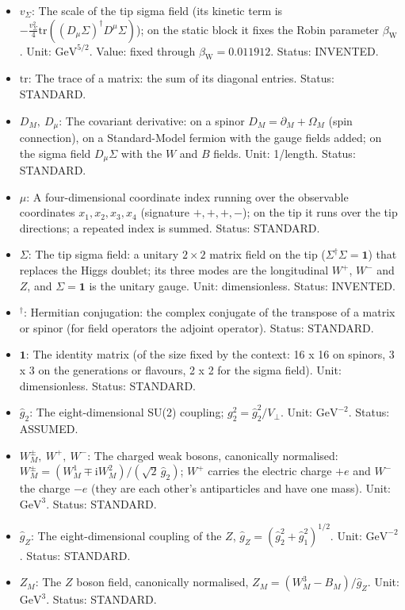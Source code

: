 \documentclass[
  10pt,
]{article}
\providecommand{\tightlist}{%
  \setlength{\itemsep}{0pt}\setlength{\parskip}{0pt}}
\begin{document}
\begin{itemize}
\tightlist
\item
  \(v_\Sigma\): The scale of the tip sigma field (its kinetic term is
  \(-\frac{v_\Sigma^2}{4}\mathrm{tr}((D_\mu\Sigma)^\dagger D^\mu\Sigma)\));
  on the static block it fixes the Robin parameter
  \(\beta_{\mathrm{W}}\). Unit: \(\mathrm{GeV}^{5/2}\). Value: fixed
  through \(\beta_{\mathrm{W}} = 0.011912\). Status: INVENTED.
\item
  \(\mathrm{tr}\): The trace of a matrix: the sum of its diagonal
  entries. Status: STANDARD.
\item
  \(D_M,\ D_\mu\): The covariant derivative: on a spinor
  \(D_M = \partial_M + \Omega_M\) (spin connection), on a Standard-Model
  fermion with the gauge fields added; on the sigma field
  \(D_\mu\Sigma\) with the \(W\) and \(B\) fields. Unit: 1/length.
  Status: STANDARD.
\item
  \(\mu\): A four-dimensional coordinate index running over the
  observable coordinates \(x_1, x_2, x_3, x_4\) (signature \(+,+,+,-\));
  on the tip it runs over the tip directions; a repeated index is
  summed. Status: STANDARD.
\item
  \(\Sigma\): The tip sigma field: a unitary \(2 \times 2\) matrix field
  on the tip (\(\Sigma^\dagger\Sigma = \mathbf{1}\)) that replaces the
  Higgs doublet; its three modes are the longitudinal \(W^+\), \(W^-\)
  and \(Z\), and \(\Sigma = \mathbf{1}\) is the unitary gauge. Unit:
  dimensionless. Status: INVENTED.
\item
  \({}^\dagger\): Hermitian conjugation: the complex conjugate of the
  transpose of a matrix or spinor (for field operators the adjoint
  operator). Status: STANDARD.
\item
  \(\mathbf{1}\): The identity matrix (of the size fixed by the context:
  16 x 16 on spinors, 3 x 3 on the generations or flavours, 2 x 2 for
  the sigma field). Unit: dimensionless. Status: STANDARD.
\item
  \(\hat g_2\): The eight-dimensional SU(2) coupling;
  \(g_2^2 = \hat g_2^2/V_\perp\). Unit: \(\mathrm{GeV}^{-2}\). Status:
  ASSUMED.
\item
  \(W^\pm_M,\ W^+,\ W^-\): The charged weak bosons, canonically
  normalised:
  \(W^\pm_M = (W^1_M \mp \mathrm{i}W^2_M)/(\sqrt2\,\hat g_2)\); \(W^+\)
  carries the electric charge \(+e\) and \(W^-\) the charge \(-e\) (they
  are each other's antiparticles and have one mass). Unit:
  \(\mathrm{GeV}^{3}\). Status: STANDARD.
\item
  \(\hat g_Z\): The eight-dimensional coupling of the \(Z\),
  \(\hat g_Z = (\hat g_2^2 + \hat g_1^2)^{1/2}\). Unit:
  \(\mathrm{GeV}^{-2}\). Status: STANDARD.
\item
  \(Z_M\): The \(Z\) boson field, canonically normalised,
  \(Z_M = (W^3_M - B_M)/\hat g_Z\). Unit: \(\mathrm{GeV}^{3}\). Status:
  STANDARD.
\end{itemize}
\end{document}
